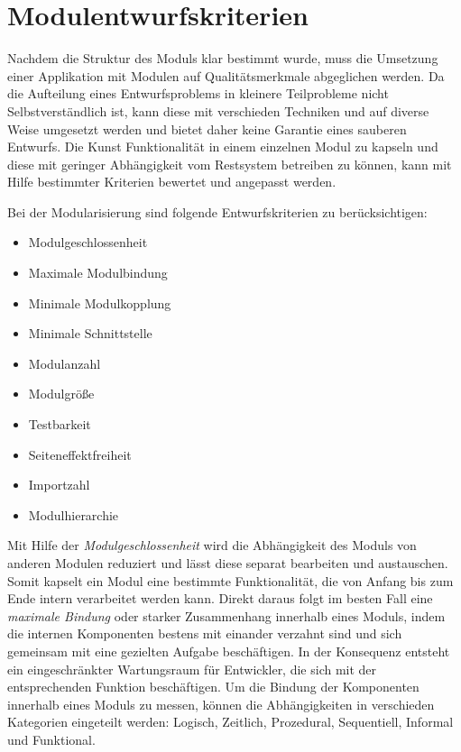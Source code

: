   \section{Modulentwurfskriterien} \label{sec:MEK}
    Nachdem die Struktur des Moduls klar bestimmt wurde, muss die Umsetzung einer Applikation mit Modulen auf Qualitätsmerkmale abgeglichen werden. Da die Aufteilung eines Entwurfsproblems in kleinere Teilprobleme nicht Selbstverständlich ist, kann diese mit verschieden Techniken und auf diverse Weise umgesetzt werden und bietet daher keine Garantie eines sauberen Entwurfs. Die Kunst Funktionalität in einem einzelnen Modul zu kapseln und diese mit geringer Abhängigkeit vom Restsystem betreiben zu können, kann mit Hilfe bestimmter Kriterien bewertet und angepasst werden. \cite{softModDes,softMdDes2,modulMitJava9,java9modRevealed,modulProgJava9}\bigbreak
    
    Bei der Modularisierung sind folgende Entwurfskriterien zu berücksichtigen: 
    \begin{itemize}
      \item Modulgeschlossenheit 
      \item Maximale Modulbindung 
      \item Minimale Modulkopplung 
      \item Minimale Schnittstelle 
      \item Modulanzahl 
      \item Modulgröße 
      \item Testbarkeit 
      \item Seiteneffektfreiheit 
      \item Importzahl 
      \item Modulhierarchie 
    \end{itemize}
    Mit Hilfe der \textit{Modulgeschlossenheit} wird die Abhängigkeit des Moduls von anderen Modulen reduziert und lässt diese separat bearbeiten und austauschen. Somit kapselt ein Modul eine bestimmte Funktionalität, die von Anfang bis zum Ende intern verarbeitet werden kann. Direkt daraus folgt im besten Fall eine \textit{maximale Bindung} oder starker Zusammenhang innerhalb eines Moduls, indem die internen Komponenten bestens mit einander verzahnt sind und sich gemeinsam mit eine gezielten Aufgabe beschäftigen. In der Konsequenz entsteht ein eingeschränkter Wartungsraum für Entwickler, die sich mit der entsprechenden Funktion beschäftigen. Um die Bindung der Komponenten innerhalb eines Moduls zu messen, können die Abhängigkeiten in verschieden Kategorien eingeteilt werden: Logisch, Zeitlich, Prozedural, Sequentiell, Informal und Funktional.

